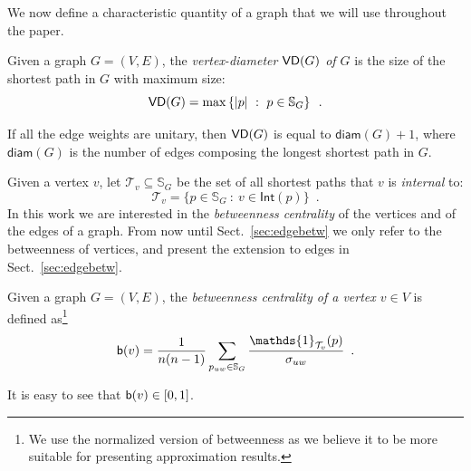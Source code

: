 We now define a characteristic quantity of a graph that we will use throughout
the paper.
\begin{definition}\label{def:vertexdiam}
  Given a graph $G=(V,E)$, the \emph{vertex-diameter $\mathsf{VD}(G)$ of $G$} is the
  size of the shortest path in $G$ with maximum size:
  \[
  \mathsf{VD}(G) = \max\left\{|p| ~:~ p\in \mathbb{S}_G\right\}\enspace.\]
\end{definition}
If all the edge weights are unitary, then $\mathsf{VD}(G)$ is equal to
$\mathsf{diam}(G)+1$, where $\mathsf{diam}(G)$ is the number of edges composing
the longest shortest path in $G$. 

Given a vertex $v$, let $\mathcal{T}_v\subseteq\mathbb{S}_G$ be the set of all
shortest paths that $v$ is \emph{internal} to:
\[
\mathcal{T}_v=\{p\in\mathbb{S}_G ~:~ v\in\mathsf{Int}(p)\}\enspace.
\]
In this work we are interested in the \emph{betweenness centrality} of the
vertices and of the edges of a graph. From now until Sect.~\ref{sec:edgebetw} we
only refer to the betweenness of vertices, and present the extension to edges in
Sect.~\ref{sec:edgebetw}.

\begin{definition}\label{def:betwenness}
  \citep{Anthonisse71,Freeman77} Given a graph $G=(V,E)$, the \emph{betweenness
  centrality of a vertex $v\in V$} is defined as\footnote{We use the normalized
  version of betweenness as we believe it to be more suitable for presenting
  approximation results.}
  \[
  \betw(v)=\frac{1}{n(n-1)}\sum_{p_{uw}\in\mathbb{S}_G}\frac{\mathds{1}_{\mathcal{T}_v}(p)}{\sigma_{uw}}%
  \enspace.
  \]
\end{definition} 
It is easy to see that $\mathsf{b}(v)\in[0,1]$. 

